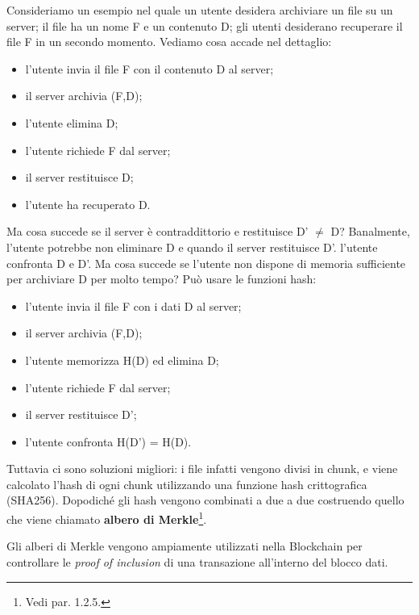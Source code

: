 Consideriamo un esempio nel quale un utente desidera archiviare un file su un server; il file ha un nome F e un contenuto D; gli utenti desiderano recuperare il file F in un secondo momento. Vediamo cosa accade nel dettaglio:
\begin{itemize}
    \item l'utente invia il file F con il contenuto D al server;
    \item il server archivia (F,D);
    \item l'utente elimina D;
    \item l'utente richiede F dal server;
    \item il server restituisce D;
    \item l'utente ha recuperato D.
\end{itemize}
Ma cosa succede se il server è contraddittorio e restituisce D' $\neq$ D? Banalmente, l'utente potrebbe non eliminare D e quando il server restituisce D'. l'utente confronta D e D'. Ma cosa succede se l'utente non dispone di memoria sufficiente per archiviare D per molto tempo? Può usare le funzioni hash:
\begin{itemize}
    \item l'utente invia il file F con i dati D al server;
    \item il server archivia (F,D);
    \item l'utente memorizza H(D) ed elimina D;
    \item l'utente richiede F dal server;
    \item il server restituisce D';
    \item l'utente confronta H(D') = H(D).
\end{itemize}
Tuttavia ci sono soluzioni migliori: i file infatti vengono divisi in chunk, e viene calcolato l'hash di ogni chunk utilizzando una funzione hash crittografica (SHA256). Dopodiché gli hash vengono combinati a due a due costruendo quello che viene chiamato \textbf{albero di Merkle}\footnote{Vedi par. 1.2.5.}.

Gli alberi di Merkle vengono ampiamente utilizzati nella Blockchain per controllare le \textit{proof of inclusion} di una transazione all'interno del blocco dati.

